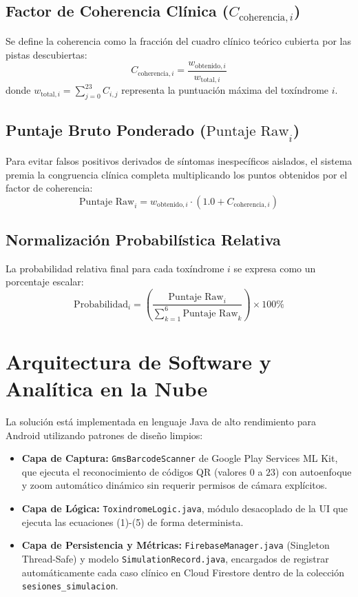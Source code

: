 \documentclass[conference,10pt,a4paper]{IEEEtran}
\begin{document}
\subsection{Factor de Coherencia Clínica ($C_{\text{coherencia}, i}$)}
Se define la coherencia como la fracción del cuadro clínico teórico cubierta por las pistas descubiertas:
\begin{equation}
C_{\text{coherencia}, i} = \frac{w_{\text{obtenido}, i}}{w_{\text{total}, i}}
\end{equation}
donde $w_{\text{total}, i} = \sum_{j=0}^{23} C_{i,j}$ representa la puntuación máxima del toxíndrome $i$.

\subsection{Puntaje Bruto Ponderado ($\text{Puntaje Raw}_i$)}
Para evitar falsos positivos derivados de síntomas inespecíficos aislados, el sistema premia la congruencia clínica completa multiplicando los puntos obtenidos por el factor de coherencia:
\begin{equation}
\text{Puntaje Raw}_i = w_{\text{obtenido}, i} \cdot \left(1.0 + C_{\text{coherencia}, i}\right)
\end{equation}

\subsection{Normalización Probabilística Relativa}
La probabilidad relativa final para cada toxíndrome $i$ se expresa como un porcentaje escalar:
\begin{equation}
\text{Probabilidad}_i = \left( \frac{\text{Puntaje Raw}_i}{\sum_{k=1}^{6} \text{Puntaje Raw}_k} \right) \times 100\text{\%}
\end{equation}

\section{Arquitectura de Software y Analítica en la Nube}
La solución está implementada en lenguaje Java de alto rendimiento para Android utilizando patrones de diseño limpios:
\begin{itemize}
    \item \textbf{Capa de Captura:} \texttt{GmsBarcodeScanner} de Google Play Services ML Kit, que ejecuta el reconocimiento de códigos QR (valores $0$ a $23$) con autoenfoque y zoom automático dinámico sin requerir permisos de cámara explícitos.
    \item \textbf{Capa de Lógica:} \texttt{ToxindromeLogic.java}, módulo desacoplado de la UI que ejecuta las ecuaciones (1)-(5) de forma determinista.
    \item \textbf{Capa de Persistencia y Métricas:} \texttt{FirebaseManager.java} (Singleton Thread-Safe) y modelo \texttt{SimulationRecord.java}, encargados de registrar automáticamente cada caso clínico en Cloud Firestore dentro de la colección \texttt{sesiones\_simulacion}.
\end{itemize}
\end{document}
